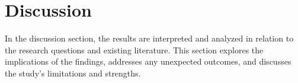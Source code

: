 \section{Discussion}
\label{section:discussion}
In the discussion section, the results are interpreted and analyzed in relation to the research questions and existing literature. This section explores the implications of the findings, addresses any unexpected outcomes, and discusses the study's limitations and strengths.

